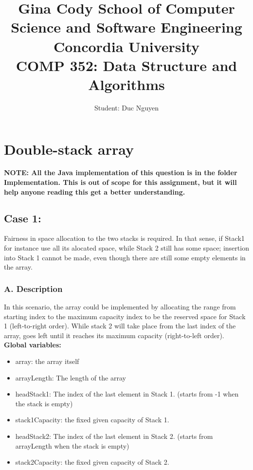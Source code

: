 \documentclass[16pt, letterpaper]{article}
\title{Gina Cody School of Computer Science and Software Engineering \\Concordia University
\\COMP 352: Data Structure and Algorithms }
\author{Student: Duc Nguyen}
\date{}
\begin{document}
\begin{titlepage}
\maketitle
\end{titlepage}
\tableofcontents

\section{Double-stack array} 
\textbf{NOTE: All the Java implementation of this question is in the folder Implementation. This is out of scope for this assignment, but it will help anyone reading this get a better understanding.}
\subsection{Case 1: }
Fairness in space allocation to the two stacks is required. In that sense, if Stack1 for instance use all its alocated space, while Stack 2 still has some space; insertion into Stack 1 cannot be made, even though there are still some empty elements in the array.

\subsubsection*{A. Description}
In this scenario, the array could be implemented by allocating the range from starting index to the maximum capacity index to be the reserved space for Stack 1 (left-to-right order). 
While stack 2 will take place from the last index of the array, goes left until it reaches its maximum capacity (right-to-left order).
\\
\textbf{Global variables:}
\begin{itemize} 
    \item array: the array itself
    \item arrayLength: The length of the array
    \item headStack1: The index of the last element in Stack 1. (starts from -1 when the stack is empty)
    \item stack1Capacity: the fixed given capacity of Stack 1.
    \item headStack2: The index of the last element in Stack 2. (starts from arrayLength when the stack is empty)
    \item stack2Capacity: the fixed given capacity of Stack 2.
\end{itemize}
\end{document}
